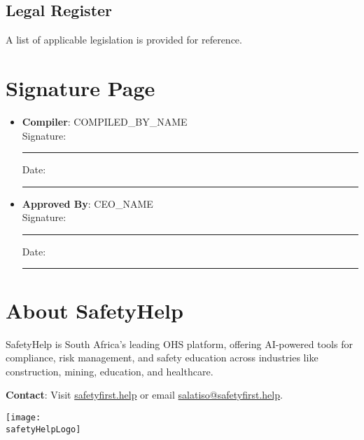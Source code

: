 \documentclass[11pt]{article}
\newcommand{\safetyHelpLogo}{/safety-plans/assets/images/logo.png}
\newcommand{\compilerName}{{{COMPILED_BY_NAME}}}
\begin{document}
\subsection{Legal Register}
A list of applicable legislation is provided for reference.

\section{Signature Page}
\begin{itemize}
  \item \textbf{Compiler}: \compilerName \\
    Signature: \rule{5cm}{0.4pt} \quad Date: \rule{3cm}{0.4pt}
  \item \textbf{Approved By}: {{CEO_NAME}} \\
    Signature: \rule{5cm}{0.4pt} \quad Date: \rule{3cm}{0.4pt}
\end{itemize}

\newpage
\section*{About SafetyHelp}
SafetyHelp is South Africa’s leading OHS platform, offering AI-powered tools for compliance, risk management, and safety education across industries like construction, mining, education, and healthcare.

\textbf{Contact}: Visit \href{https://safetyfirst.help}{safetyfirst.help} or email \href{mailto:salatiso@safetyfirst.help}{salatiso@safetyfirst.help}.

\vspace{2cm}
\hfill \texttt{[image: \\safetyHelpLogo]}

\label{LastPage}
\end{document}
